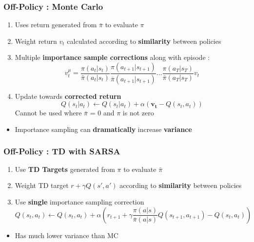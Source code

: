 \documentclass[12pt]{article} %
\begin{document}
\subsubsection{Off-Policy : Monte Carlo}
\begin{enumerate}

\item Uses return generated from $\bar{\pi}$ to evaluate $\pi$
\item Weight return $v_t$ calculated according to \textbf{similarity} between policies
\item Multiple \textbf{importance sample corrections} along with episode : 
$$ v_t^{\mu} = \frac{\pi(a_t|s_t)}{\bar{\pi}(a_t|s_t)}\frac{\pi(a_{t+1}|s_{t+1})}{\bar{\pi}(a_{t+1}|s_{t+1})}...\frac{\pi(a_T|s_T)}{\bar{\pi}(a_T|s_T)}v_t$$
\item Update towards \textbf{corrected return}
$$ Q(s_t|a_t)\leftarrow Q(s_t|a_t) + \alpha(\bm{v_t} -Q(s_t,a_t))$$
Cannot be used where $\bar{\pi}$ = 0 and $\pi$ is not zero
\end{enumerate}
\begin{itemize}

\item Importance sampling can \textbf{dramatically} increase \textbf{variance}
\end{itemize}

\subsubsection{Off-Policy : TD with SARSA}
\begin{enumerate}
\item Use \textbf{TD Targets} generated from $\pi$ to evaluate $\bar{\pi}$
\item Weight TD target $r+\gamma Q(s',a')$ according to \textbf{similarity} between policies
\item Use \textbf{single} importance sampling correction
$$ Q(s_t,a_t) \leftarrow Q(s_t,a_t) + \alpha \left( r_{t+1} + \gamma \frac{\pi(a|s)}{\bar{\pi}(a|s)}Q(s_{t+1},a_{t+1}) - Q(s_t,a_t) \right)$$
\end{enumerate}

\begin{itemize}
\item Has much lower variance than MC
\end{itemize}
\end{document}
